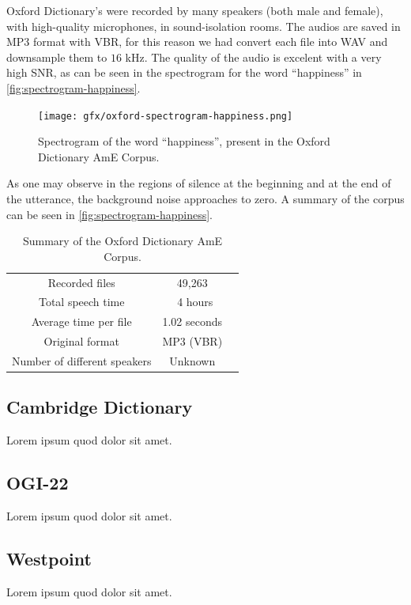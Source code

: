 Oxford Dictionary's were recorded by many speakers (both male and female), with high-quality microphones, in sound-isolation rooms.
The audios are saved in MP3 format with \ac{VBR}, for this reason we had convert each file into WAV and downsample them to $16$ kHz.
The quality of the audio is excelent with a very high \ac{SNR}, as can be seen in the spectrogram for the word ``happiness'' 
in \autoref{fig:spectrogram-happiness}.

\begin{figure}[!htb]
        \myfloatalign
        {\texttt{[image: gfx/oxford-spectrogram-happiness.png]}}
        \caption{Spectrogram of the word ``happiness'', present in the Oxford Dictionary AmE Corpus.}
        \label{fig:spectrogram-happiness}
\end{figure}

As one may observe in the regions of silence at the beginning and at the end of the utterance, the background noise approaches to zero.
A summary of the corpus can be seen in \autoref{fig:spectrogram-happiness}.

\begin{table}[!htb]
\caption[Summary of the Oxford Dictionary AmE Corpus.]{Summary of the Oxford Dictionary AmE Corpus.}
\smallskip
\centering
\begin{tabular}{ccc} \toprule
  Recorded files & 49,263 \\
  Total speech time & ~4 hours \\
  Average time per file & 1.02 seconds \\
  Original format & MP3 (VBR) \\
  Number of different speakers & Unknown \\
  \bottomrule
\end{tabular}
\label{tab:oxford-summary}
\end{table}

\subsection{Cambridge Dictionary}
Lorem ipsum quod dolor sit amet.

\subsection{OGI-22}
Lorem ipsum quod dolor sit amet.

\subsection{Westpoint}
Lorem ipsum quod dolor sit amet.

